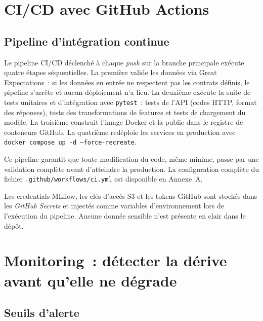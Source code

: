 \section{CI/CD avec GitHub Actions}

\subsection{Pipeline d'intégration continue}

Le pipeline CI/CD déclenché à chaque \textit{push} sur la branche principale
exécute quatre étapes séquentielles. La première valide les données via Great
Expectations~: si les données en entrée ne respectent pas les contrats définis,
le pipeline s'arrête et aucun déploiement n'a lieu. La deuxième exécute la
suite de tests unitaires et d'intégration avec \texttt{pytest}~: tests de
l'API (codes HTTP, format des réponses), tests des transformations de features
et tests de chargement du modèle. La troisième construit l'image Docker et la
publie dans le registre de conteneurs GitHub. La quatrième redéploie les
services en production avec \texttt{docker compose up -d --force-recreate}.

Ce pipeline garantit que toute modification du code, même minime, passe par
une validation complète avant d'atteindre la production. La configuration
complète du fichier \texttt{.github/workflows/ci.yml} est disponible en Annexe~A.

\begin{alertbox}
Les credentials MLflow, les clés d'accès S3 et les tokens GitHub sont stockés
dans les \textit{GitHub Secrets} et injectés comme variables d'environnement
lors de l'exécution du pipeline. Aucune donnée sensible n'est présente en clair
dans le dépôt.
\end{alertbox}

\section{Monitoring~: détecter la dérive avant qu'elle ne dégrade}

\subsection{Seuils d'alerte}

